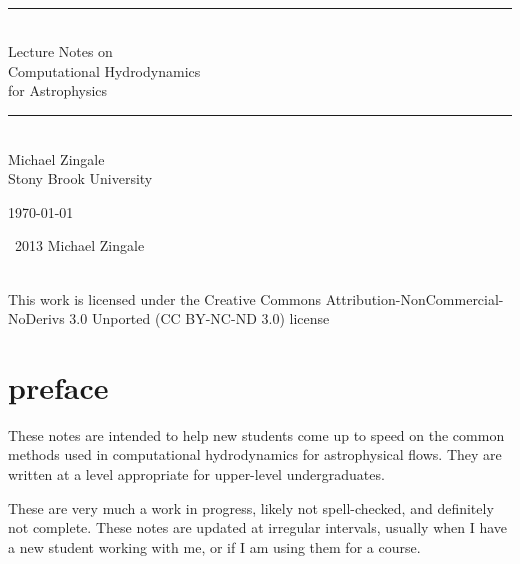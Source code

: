 \documentclass[11pt]{book}
\newcommand{\HRule}{\rule{\linewidth}{0.125mm}}
\renewcommand{\chaptermark}[1]{%
 \markboth{\chaptername
\ \thechapter.\ #1}{}}
\begin{document}
\frontmatter

\begin{titlepage}

\ \\[2.5in]
\begin{center}
\HRule\\[0.5em]
{\Huge \textsf{{
Lecture Notes on\\[0.1em]
Computational Hydrodynamics\\[0.3em]
for Astrophysics}}
}
\HRule
\\[2em]

{\Large \sf Michael Zingale} \\ {\sf Stony Brook University}
\end{center}

\vfill

\begin{flushright}
\today
\end{flushright}

\end{titlepage}

\null \vfill 

\noindent \ccCopy\ 2013 Michael Zingale 

\noindent \ccbyncnd \\
\noindent This work is licensed under the Creative Commons
Attribution-NonCommercial-NoDerivs 3.0 Unported (CC BY-NC-ND 3.0)
license

\clearpage



\setcounter{tocdepth}{2}
\tableofcontents

\clearpage

\listoffigures
{}

\clearpage

\listofexercise
{}

\clearpage

\chapter*{preface}
\chaptermark{preface}


These notes are intended to help new students come up to speed on the
common methods used in computational hydrodynamics for astrophysical
flows.  They are written at a level appropriate for upper-level
undergraduates.

These are very much a work in progress, likely not spell-checked, and 
definitely not complete.  These notes are updated at irregular
intervals, usually when I have a new student working with me, or if
I am using them for a course.
\end{document}

